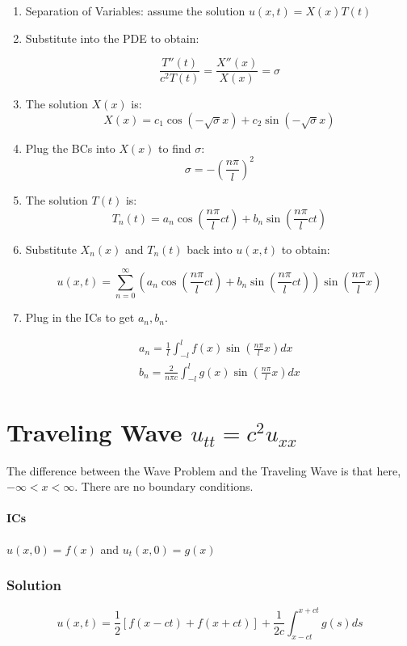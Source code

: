 \documentclass[11pt]{article}
\begin{document}
\begin{enumerate}

\item Separation of Variables: assume the solution $u(x,t) = X(x)T(t)$
\item Substitute into the PDE to obtain:

$$ \frac{T''(t)}{c^2T(t)} = \frac{X''(x)}{X(x)} = \sigma $$

\item The solution $X(x)$ is:
$$ X(x) = c_1\cos(-\sqrt{\sigma}x) + c_2\sin(-\sqrt{\sigma}x) $$

\item Plug the BCs into $X(x)$ to find $\sigma$:
$$ \sigma = -(\frac{n\pi}{l})^2 $$

\item The solution $T(t)$ is:
$$ T_n(t) = a_n\cos(\frac{n\pi}{l}ct) + b_n\sin(\frac{n\pi}{l}ct) $$

\item Substitute $X_n(x)$ and $T_n(t)$ back into $u(x,t)$ to obtain:

$$ u(x,t) = \sum \limits_{n=0}^{\infty} \left( a_n\cos(\frac{n\pi}{l}ct) + b_n\sin(\frac{n\pi}{l}ct) \right) \sin(\frac{n\pi}{l}x)$$

\item Plug in the ICs to get $a_n, b_n$.

\begin{gather*}
a_n = \frac{1}{l} \int_{-l}^{l} f(x) \sin(\frac{n\pi}{l}x) dx \\
b_n = \frac{2}{n\pi c} \int_{-l}^{l} g(x) \sin(\frac{n\pi}{l}x) dx
\end{gather*}

\end{enumerate}



\section{Traveling Wave $u_{tt}=c^2u_{xx}$}
The difference between the Wave Problem and the Traveling Wave is that here, $-\infty<x<\infty$. There are no boundary conditions.
\paragraph{ICs} $u(x,0) = f(x)$ and $u_t(x,0) = g(x)$

\subsubsection*{Solution}
$$u(x,t) = \frac{1}{2} [ f(x-ct) + f(x+ct)] + \frac{1}{2c} \int_{x-ct}^{x+ct} g(s) ds $$
\end{document}
